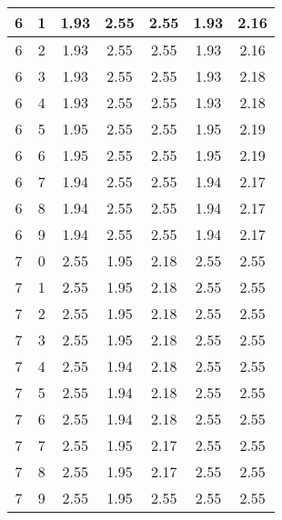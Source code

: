 \begin{longtable}{|c|c||c||c|c||c|c|}
	6 & 1 & 1.93 & 2.55 & 2.55 & 1.93 & 2.16 \\ \hline
	6 & 2 & 1.93 & 2.55 & 2.55 & 1.93 & 2.16 \\ \hline
	6 & 3 & 1.93 & 2.55 & 2.55 & 1.93 & 2.18 \\ \hline
	6 & 4 & 1.93 & 2.55 & 2.55 & 1.93 & 2.18 \\ \hline
	6 & 5 & 1.95 & 2.55 & 2.55 & 1.95 & 2.19 \\ \hline
	6 & 6 & 1.95 & 2.55 & 2.55 & 1.95 & 2.19 \\ \hline
	6 & 7 & 1.94 & 2.55 & 2.55 & 1.94 & 2.17 \\ \hline
	6 & 8 & 1.94 & 2.55 & 2.55 & 1.94 & 2.17 \\ \hline
	6 & 9 & 1.94 & 2.55 & 2.55 & 1.94 & 2.17 \\ \hline
	7 & 0 & 2.55 & 1.95 & 2.18 & 2.55 & 2.55 \\ \hline
	7 & 1 & 2.55 & 1.95 & 2.18 & 2.55 & 2.55 \\ \hline
	7 & 2 & 2.55 & 1.95 & 2.18 & 2.55 & 2.55 \\ \hline
	7 & 3 & 2.55 & 1.95 & 2.18 & 2.55 & 2.55 \\ \hline
	7 & 4 & 2.55 & 1.94 & 2.18 & 2.55 & 2.55 \\ \hline
	7 & 5 & 2.55 & 1.94 & 2.18 & 2.55 & 2.55 \\ \hline
	7 & 6 & 2.55 & 1.94 & 2.18 & 2.55 & 2.55 \\ \hline
	7 & 7 & 2.55 & 1.95 & 2.17 & 2.55 & 2.55 \\ \hline
	7 & 8 & 2.55 & 1.95 & 2.17 & 2.55 & 2.55 \\ \hline
	7 & 9 & 2.55 & 1.95 & 2.55 & 2.55 & 2.55 \\ \hline
\end{longtable}

